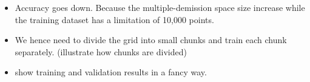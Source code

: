 


\begin{itemize}
\item Accuracy goes down. Because the multiple-demission space size increase while the training dataset has a limitation of 10,000 points.  
\item We hence need to divide the grid into small chunks and train each chunk separately.  (illustrate how chunks are divided)
\item  show training and validation results in a fancy way. 
\end{itemize}









